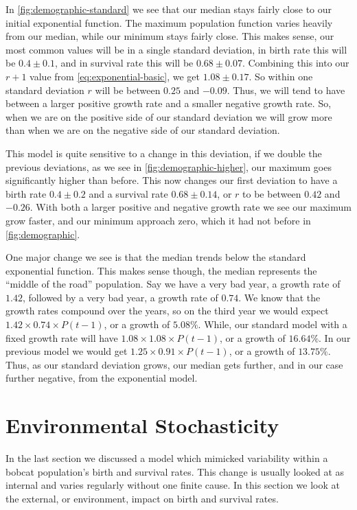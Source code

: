 \documentclass{article}
\begin{document}
In \cref{fig:demographic-standard} we see that our median stays fairly close to our initial exponential function. The maximum population function varies heavily from our median, while our minimum stays fairly close. This makes sense, our most common values will be in a single standard deviation, in birth rate this will be $0.4 \pm 0.1$, and in survival rate this will be $0.68 \pm 0.07$. Combining this into our $r + 1$ value from \cref{eq:exponential-basic}, we get $1.08 \pm 0.17$. So within one standard deviation $r$ will be between $0.25$ and $-0.09$. Thus, we will tend to have between a larger positive growth rate and a smaller negative growth rate. So, when we are on the positive side of our standard deviation we will grow more than when we are on the negative side of our standard deviation.

This model is quite sensitive to a change in this deviation, if we double the previous deviations, as we see in \cref{fig:demographic-higher}, our maximum goes significantly higher than before. This now changes our first deviation to have a birth rate $0.4 \pm 0.2$ and a survival rate $0.68 \pm 0.14$, or $r$ to be between $0.42$ and $-0.26$. With both a larger positive and negative growth rate we see our maximum grow faster, and our minimum approach zero, which it had not before in \cref{fig:demographic}.

One major change we see is that the median trends below the standard exponential function. This makes sense though, the median represents the ``middle of the road'' population. Say we have a very bad year, a growth rate of $1.42$, followed by a very bad year, a growth rate of $0.74$. We know that the growth rates compound over the years, so on the third year we would expect $1.42 \times 0.74 \times P(t-1)$, or a growth of $5.08\%$. While, our standard model with a fixed growth rate will have $1.08 \times 1.08 \times P(t-1)$, or a growth of $16.64\%$. In our previous model we would get $1.25 \times 0.91 \times P(t-1)$, or a growth of $13.75\%$. Thus, as our standard deviation grows, our median gets further, and in our case further negative, from the exponential model.


\section{Environmental Stochasticity}

In the last section we discussed a model which mimicked variability within a bobcat population's birth and survival rates. This change is usually looked at as internal and varies regularly without one finite cause. In this section we look at the external, or environment, impact on birth and survival rates.
\end{document}
